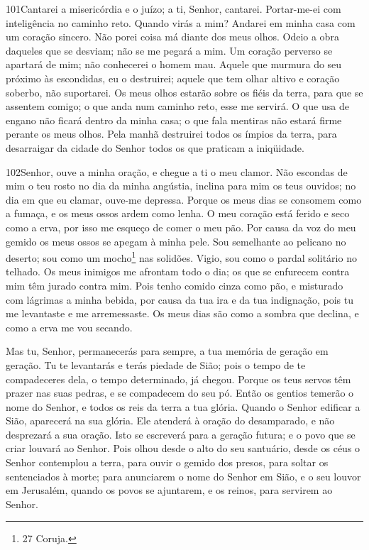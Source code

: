 \bigskip

\lettrine{101}{}Cantarei a misericórdia e o juízo; a ti,
Senhor, cantarei. Portar-me-ei com inteligência no caminho reto.
Quando virás a mim? Andarei em minha casa com um coração sincero.
Não porei coisa má diante dos meus olhos. Odeio a obra daqueles
que se desviam; não se me pegará a mim. Um coração perverso se
apartará de mim; não conhecerei o homem mau. Aquele que murmura
do seu próximo às escondidas, eu o destruirei; aquele que tem olhar
altivo e coração soberbo, não suportarei. Os meus olhos estarão
sobre os fiéis da terra, para que se assentem comigo; o que anda num
caminho reto, esse me servirá. O que usa de engano não ficará
dentro da minha casa; o que fala mentiras não estará firme perante
os meus olhos. Pela manhã destruirei todos os ímpios da terra,
para desarraigar da cidade do Senhor todos os que praticam a
iniqüidade.

\bigskip

\lettrine{102}{}Senhor, ouve a minha oração, e chegue a ti o
meu clamor. Não escondas de mim o teu rosto no dia da minha
angústia, inclina para mim os teus ouvidos; no dia em que eu clamar,
ouve-me depressa. Porque os meus dias se consomem como a fumaça,
e os meus ossos ardem como lenha. O meu coração está ferido e
seco como a erva, por isso me esqueço de comer o meu pão. Por
causa da voz do meu gemido os meus ossos se apegam à minha pele.
Sou semelhante ao pelicano no deserto; sou como um
mocho\footnote{27 Coruja.} nas solidões. Vigio, sou como o
pardal solitário no telhado. Os meus inimigos me afrontam todo o
dia; os que se enfurecem contra mim têm jurado contra mim. Pois
tenho comido cinza como pão, e misturado com lágrimas a minha
bebida, por causa da tua ira e da tua indignação, pois tu me
levantaste e me arremessaste. Os meus dias são como a sombra
que declina, e como a erva me vou secando.

Mas tu, Senhor, permanecerás para sempre, a tua memória de
geração em geração. Tu te levantarás e terás piedade de Sião;
pois o tempo de te compadeceres dela, o tempo determinado, já
chegou. Porque os teus servos têm prazer nas suas pedras, e
se compadecem do seu pó. Então os gentios temerão o nome do
Senhor, e todos os reis da terra a tua glória. Quando o
Senhor edificar a Sião, aparecerá na sua glória. Ele atenderá
à oração do desamparado, e não desprezará a sua oração. Isto
se escreverá para a geração futura; e o povo que se criar louvará ao
Senhor. Pois olhou desde o alto do seu santuário, desde os
céus o Senhor contemplou a terra, para ouvir o gemido dos
presos, para soltar os sentenciados à morte; para anunciarem
o nome do Senhor em Sião, e o seu louvor em Jerusalém, quando
os povos se ajuntarem, e os reinos, para servirem ao Senhor.

